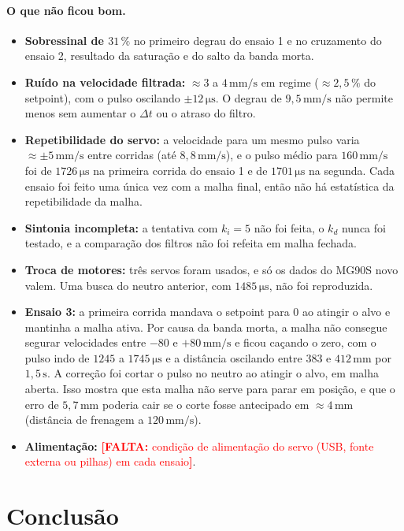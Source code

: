 \documentclass[11pt,a4paper]{article}
\newcommand{\pendente}[1]{\textcolor{red}{\textbf{[FALTA:} #1\textbf{]}}}
\newcommand{\unid}[1]{\,\mathrm{#1}}
\begin{document}
\paragraph{O que não ficou bom.}
\begin{itemize}[nosep]
  \item \textbf{Sobressinal de $31\,\%$} no primeiro degrau do ensaio 1 e no cruzamento do ensaio 2, resultado da saturação e do salto da banda morta.
  \item \textbf{Ruído na velocidade filtrada:} $\approx 3$ a $4\unid{mm/s}$ em regime ($\approx 2{,}5\,\%$ do setpoint), com o pulso oscilando $\pm 12\unid{\mu s}$. O degrau de $9{,}5\unid{mm/s}$ não permite menos sem aumentar o $\Delta t$ ou o atraso do filtro.
  \item \textbf{Repetibilidade do servo:} a velocidade para um mesmo pulso varia $\approx \pm 5\unid{mm/s}$ entre corridas (até $8{,}8\unid{mm/s}$), e o pulso médio para $160\unid{mm/s}$ foi de $1726\unid{\mu s}$ na primeira corrida do ensaio 1 e de $1701\unid{\mu s}$ na segunda. Cada ensaio foi feito uma única vez com a malha final, então não há estatística da repetibilidade da malha.
  \item \textbf{Sintonia incompleta:} a tentativa com $k_i = 5$ não foi feita, o $k_d$ nunca foi testado, e a comparação dos filtros não foi refeita em malha fechada.
  \item \textbf{Troca de motores:} três servos foram usados, e só os dados do MG90S novo valem. Uma busca do neutro anterior, com $1485\unid{\mu s}$, não foi reproduzida.
  \item \textbf{Ensaio 3:} a primeira corrida mandava o setpoint para $0$ ao atingir o alvo e mantinha a malha ativa. Por causa da banda morta, a malha não consegue segurar velocidades entre $-80$ e $+80\unid{mm/s}$ e ficou caçando o zero, com o pulso indo de $1245$ a $1745\unid{\mu s}$ e a distância oscilando entre $383$ e $412\unid{mm}$ por $1{,}5\unid{s}$. A correção foi cortar o pulso no neutro ao atingir o alvo, em malha aberta. Isso mostra que esta malha não serve para parar em posição, e que o erro de $5{,}7\unid{mm}$ poderia cair se o corte fosse antecipado em $\approx 4\unid{mm}$ (distância de frenagem a $120\unid{mm/s}$).
  \item \textbf{Alimentação:} \pendente{condição de alimentação do servo (USB, fonte externa ou pilhas) em cada ensaio}.
\end{itemize}

\section{Conclusão}
\end{document}
